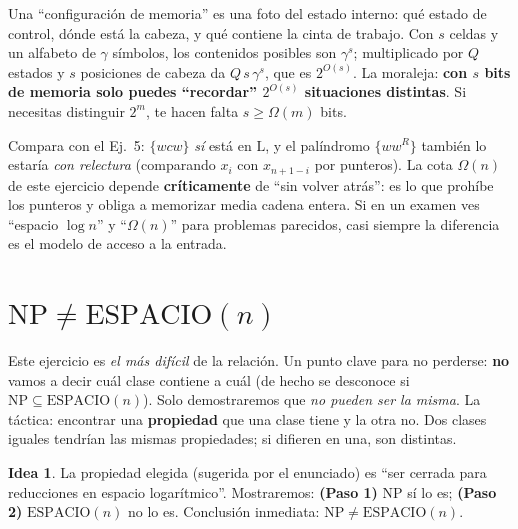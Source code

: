 \documentclass[11pt,a4paper]{article}
\theoremstyle{plain}
\theoremstyle{definition}
\newtheorem*{idea}{Idea}
\newcommand{\NP}{\mathrm{NP}}
\newcommand{\Lclass}{\mathrm{L}}
\newcommand{\SPACE}{\mathrm{ESPACIO}}
\begin{document}
\begin{concepto}[Por qu\'e ``$\#$configuraciones $=2^{O(s)}$'']
Una ``configuraci\'on de memoria'' es una foto del estado interno: qu\'e estado de
control, d\'onde est\'a la cabeza, y qu\'e contiene la cinta de trabajo. Con $s$
celdas y un alfabeto de $\gamma$ s\'imbolos, los contenidos posibles son $\gamma^s$;
multiplicado por $Q$ estados y $s$ posiciones de cabeza da $Q\,s\,\gamma^s$, que es
$2^{O(s)}$. La moraleja: \textbf{con $s$ bits de memoria solo puedes ``recordar''
$2^{O(s)}$ situaciones distintas}. Si necesitas distinguir $2^m$, te hacen falta
$s\ge\Omega(m)$ bits.
\end{concepto}

\begin{cuidado}
Compara con el Ej.\ 5: $\{wcw\}$ \emph{s\'i} est\'a en $\Lclass$, y el pal\'indromo
$\{ww^R\}$ tambi\'en lo estar\'ia \emph{con relectura} (comparando $x_i$ con
$x_{n+1-i}$ por punteros). La cota $\Omega(n)$ de este ejercicio depende
\textbf{cr\'iticamente} de ``sin volver atr\'as'': es lo que proh\'ibe los punteros y
obliga a memorizar media cadena entera. Si en un examen ves ``espacio $\log n$'' y
``$\Omega(n)$'' para problemas parecidos, casi siempre la diferencia es el modelo de
acceso a la entrada.
\end{cuidado}

\section{$\NP\neq\SPACE(n)$}

\begin{cuidado}
Este ejercicio es \emph{el m\'as dif\'icil} de la relaci\'on. Un punto clave para no
perderse: \textbf{no} vamos a decir cu\'al clase contiene a cu\'al (de hecho se
desconoce si $\NP\subseteq\SPACE(n)$). Solo demostraremos que \emph{no pueden ser la
misma}. La t\'actica: encontrar una \textbf{propiedad} que una clase tiene y la otra
no. Dos clases iguales tendr\'ian las mismas propiedades; si difieren en una, son
distintas.
\end{cuidado}

\begin{idea}
La propiedad elegida (sugerida por el enunciado) es ``ser cerrada para reducciones en
espacio logar\'itmico''. Mostraremos: \textbf{(Paso 1)} $\NP$ s\'i lo es;
\textbf{(Paso 2)} $\SPACE(n)$ no lo es. Conclusi\'on inmediata: $\NP\neq\SPACE(n)$.
\end{idea}
\end{document}

